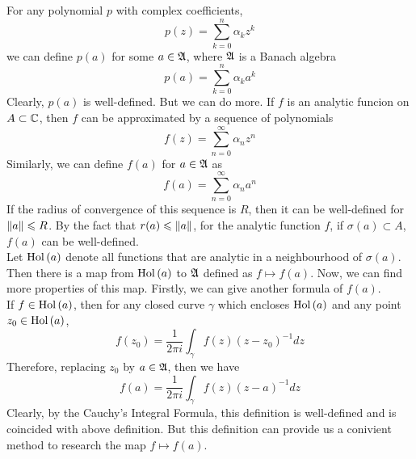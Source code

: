 \documentclass[a4paper,11pt]{report}
\begin{document}
For any polynomial $p$ with complex coefficients,  
\begin{equation*}
	p(z) = \sum_{k=0}^{n} \alpha_k z^{k}
\end{equation*}
we can define $p(a)$ for some $a \in \mathfrak{A}$, where $\mathfrak{A}$ is a Banach algebra
\begin{equation*}
	p(a) = \sum_{k=0}^{n} \alpha_k a^{k}
\end{equation*}
Clearly, $p(a)$ is well-defined. But we can do more. If $f$ is an analytic funcion on $A \subset \mathbb{C}$, then $f$ can be approximated by a sequence of polynomials
\begin{equation*}
	f(z) = \sum_{n=0}^{\infty} \alpha_n z^{n}
\end{equation*}
Similarly, we can define $f(a)$ for $a \in \mathfrak{A}$ as
\begin{equation*}
	f(a) = \sum_{n=0}^{\infty} \alpha_n a^{n}
\end{equation*}
If the radius of convergence of this sequence is $R$, then it can be well-defined for $\left\lVert a\right\lVert \leqslant R$. By the fact that $r(a) \leqslant \left\lVert a\right\lVert$, for the analytic function $f$, if $\sigma(a) \subset A$, $f(a)$ can be well-defined.\\
Let $\operatorname{Hol}{(a)}$ denote all functions that are analytic in a neighbourhood of $\sigma(a)$. Then there is a map from $\operatorname{Hol}{(a)}$ to $\mathfrak{A}$ defined as $f \mapsto f(a)$. Now, we can find more properties of this map. Firstly, we can give another formula of $f(a)$.\\
If $f \in \operatorname{Hol}{(a)}$, then for any closed curve $\gamma$ which encloses $\operatorname{Hol}{(a)}$ and any point $z_0 \in \operatorname{Hol}{(a)}$, 
\begin{equation*}
	f(z_0) = \frac{1}{2 \pi i}\int_{\gamma} f(z) (z-z_0)^{-1} dz
\end{equation*}
Therefore, replacing $z_0$ by $a \in \mathfrak{A}$, then we have 
\begin{equation*}
	f(a) = \frac{1}{2 \pi i}\int_{\gamma} f(z) (z-a)^{-1} dz
\end{equation*}
Clearly, by the Cauchy's Integral Formula, this definition is well-defined and is coincided with above definition. But this definition can provide us a conivient method to research the map $f \mapsto f(a)$.
\end{document}
